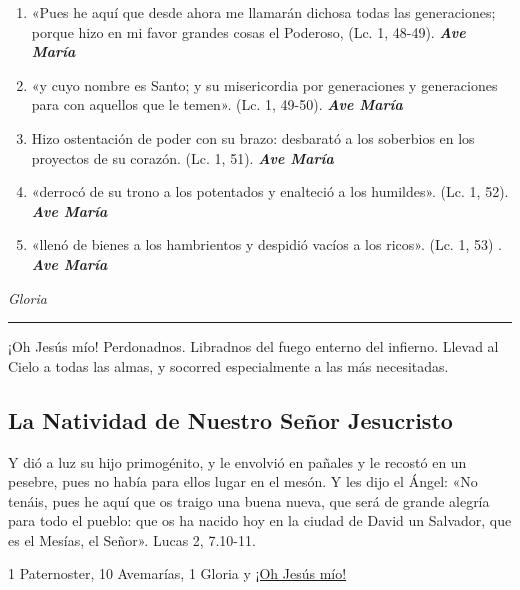 \documentclass[a4paper,11pt, oneside]{report}
\begin{document}
{{\begin{enumerate}
      \item «Pues he aquí que desde ahora me llamarán dichosa todas las generaciones; 
      porque hizo en mi favor grandes cosas el Poderoso, (Lc. 1, 48-49). \textbf{\textit{Ave María}}

      \item «y cuyo nombre es Santo; y su misericordia por generaciones y generaciones para con aquellos que le temen». (Lc. 1, 49-50). \textbf{\textit{Ave María}}

      \item Hizo ostentación de poder con su brazo: desbarató a los soberbios en los proyectos de su corazón. (Lc. 1, 51). \textbf{\textit{Ave María}}

      \item «derrocó de su trono a los potentados y enalteció a los humildes». (Lc. 1, 52). \textbf{\textit{Ave María}}

      \item «llenó de bienes a los hambrientos y despidió vacíos a los ricos». (Lc. 1, 53) . \textbf{\textit{Ave María}}
    \end{enumerate}

    \indent\textit{Gloria}

    \begin{center}\rule{1\linewidth}{\linethickness}\end{center}

    \hypertarget{finalVisitacion}{¡Oh Jesús mío! Perdonadnos. Libradnos del fuego enterno del infierno. Llevad al Cielo a todas las almas, y socorred especialmente a las más 
    necesitadas.}
  }
                      
  \subsection*{La Natividad de Nuestro Señor Jesucristo}
  {

    Y dió a luz su hijo primogénito, y le envolvió en pañales y le recostó en un pesebre, pues no había para ellos lugar en el mesón. Y les dijo el Ángel: 
    «No tenáis, pues he aquí que os traigo una buena nueva, que será de grande alegría para todo el pueblo: que os ha nacido hoy en la ciudad de David
    un Salvador, que es el Mesías, el Señor». Lucas 2, 7.10-11.
    
    \medskip
    
    1 Paternoster, 10 Avemarías, 1 Gloria y \hyperlink{finalNatividad}{¡Oh Jesús mío!}
    
}}
\end{document}
